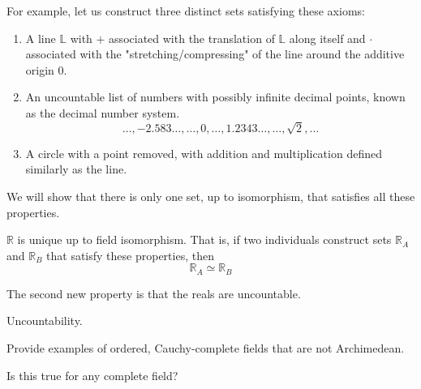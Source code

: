 \documentclass{article}
\begin{document}
      \begin{example}
        For example, let us construct three distinct sets satisfying these axioms: 
        \begin{enumerate}
          \item A line $\mathbb{L}$ with $+$ associated with the translation of $\mathbb{L}$ along itself and $\cdot$ associated with the "stretching/compressing" of the line around the additive origin $0$. 
          \item An uncountable list of numbers with possibly infinite decimal points, known as the decimal number system. 
          \begin{equation}
            \ldots, -2.583\ldots, \ldots , 0, \ldots, 1.2343\ldots, \ldots, \sqrt{2}, \ldots
          \end{equation}
          \item A circle with a point removed, with addition and multiplication defined similarly as the line. 
        \end{enumerate}
      \end{example}

      We will show that there is only one set, up to isomorphism, that satisfies all these properties. 

      \begin{theorem}[Uniqueness]
        $\mathbb{R}$ is unique up to field isomorphism. That is, if two individuals construct sets  $\mathbb{R}_A$ and $\mathbb{R}_B$ that satisfy these properties, then 
        \begin{equation}
          \mathbb{R}_A \simeq \mathbb{R}_B
        \end{equation}
      \end{theorem} 

      The second new property is that the reals are uncountable. 

      \begin{theorem}
        Uncountability. 
      \end{theorem} 

      \begin{theorem}
        
      \end{theorem}

      Provide examples of ordered, Cauchy-complete fields that are not Archimedean. 

      \begin{theorem}
        Is this true for any complete field? 
      \end{theorem}
\end{document}
